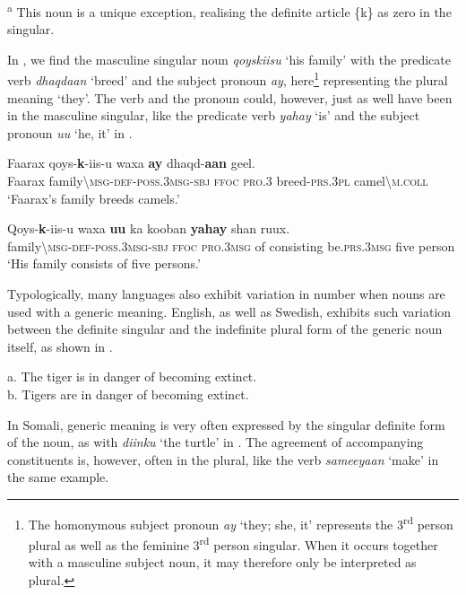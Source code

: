 \documentclass[output=paper]{langsci/langscibook}
\begin{document}
\textsuperscript{a} This noun is a unique exception, realising the definite article \{k\} as zero in the singular.

In , we find the masculine singular noun \textit{qoyskiisu} ‘his family’ with the predicate verb \textit{dhaqdaan} ‘breed’ and the subject pronoun \textit{ay}, here\footnote{The homonymous subject pronoun \textit{ay} ‘they; she, it’ represents the 3\textsuperscript{rd} person plural as well as the feminine 3\textsuperscript{rd} person singular. When it occurs together with a masculine subject noun, it may therefore only be interpreted as plural.} representing the plural meaning ‘they’. The verb and the pronoun could, however, just as well have been in the masculine singular, like the predicate verb \textit{yahay} ‘is’ and the subject pronoun \textit{uu} ‘he, it’ in .

\ea
\gll Faarax  qoys-\textbf{k}{}-iis-u        waxa  \textbf{ay}    dhaqd-\textbf{aan}  geel.\\
     Faarax  family{\textbackslash}\textsc{msg-def-poss.3msg-sbj    ffoc}  \textsc{pro.3}  breed-\textsc{prs.3pl}  camel{\textbackslash}\textsc{m.coll}\\
\glt ‘Faarax’s family breeds camels.’
\z

\ea
\gll Qoys-\textbf{k}{}-iis-u      waxa  \textbf{uu}    ka  kooban    \textbf{yahay}    shan  ruux.\\
     family{\textbackslash}\textsc{msg-def-poss.3msg-sbj  ffoc  pro.3msg}  of  consisting  be.\textsc{prs.3msg}  five  person\\
\glt ‘His family consists of five persons.’
\z

Typologically, many languages also exhibit variation in number when nouns are used with a generic meaning. English, as well as Swedish, exhibits such variation between the definite singular and the indefinite plural form of the generic noun itself, as shown in .

\ea
 a.  The tiger is in danger of becoming extinct.\\
 b.  Tigers are in danger of becoming extinct.\\
\z

In Somali, generic meaning is very often expressed by the singular definite form of the noun, as with \textit{diinku} ‘the turtle’ in . The agreement of accompanying constituents is, however, often in the plural, like the verb \textit{sameeyaan} ‘make’ in the same example.
\end{document}

